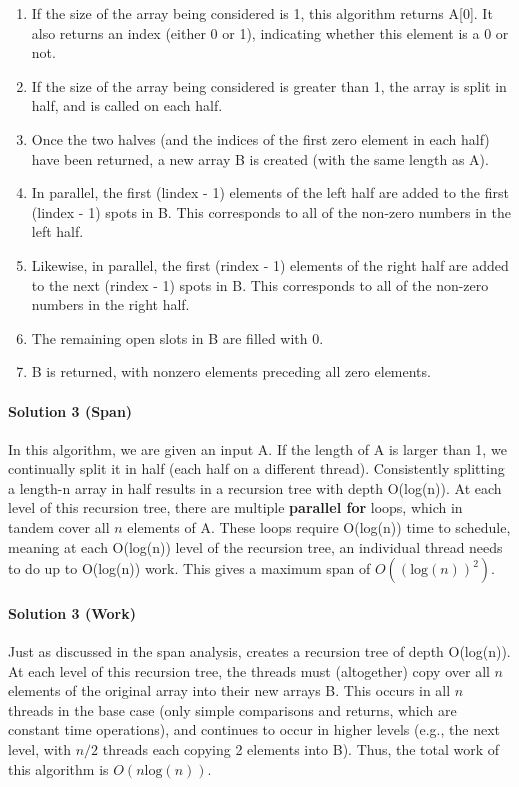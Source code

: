 \documentclass[11pt]{article}
\begin{document}
\begin{enumerate}
    \item If the size of the array being considered is 1, this algorithm returns A[0]. It also returns an index (either 0 or 1), indicating whether this element is a 0 or not.
    \item If the size of the array being considered is greater than 1, the array is split in half, and  is called on each half.
    \item Once the two halves (and the indices of the first zero element in each half) have been returned, a new array B is created (with the same length as A).
    \item In parallel, the first (lindex - 1) elements of the left half are added to the first (lindex - 1) spots in B. This corresponds to all of the non-zero numbers in the left half.
    \item Likewise, in parallel, the first (rindex - 1) elements of the right half are added to the next (rindex - 1) spots in B. This corresponds to all of the non-zero numbers in the right half.
    \item The remaining open slots in B are filled with 0.
    \item B is returned, with nonzero elements preceding all zero elements.
\end{enumerate}

\paragraph{Solution 3 (Span)}

In this algorithm, we are given an input A. If the length of A is larger than 1, we continually split it in half (each half on a different thread). Consistently splitting a length-n array in half results in a recursion tree with depth O(log(n)). At each level of this recursion tree, there are multiple \textbf{parallel for} loops, which in tandem cover all $n$ elements of A. These loops require O(log(n)) time to schedule, meaning at each O(log(n)) level of the recursion tree, an individual thread needs to do up to O(log(n)) work. This gives a maximum span of $O((\text{log}(n))^2)$.

\paragraph{Solution 3 (Work)}

Just as discussed in the span analysis,  creates a recursion tree of depth O(log(n)). At each level of this recursion tree, the threads must (altogether) copy over all $n$ elements of the original array into their new arrays B. This occurs in all $n$ threads in the base case (only simple comparisons and returns, which are constant time operations), and continues to occur in higher levels (e.g., the next level, with $n / 2$ threads each copying 2 elements into B). Thus, the total work of this algorithm is $O(n \text{log}(n))$.
\end{document}
